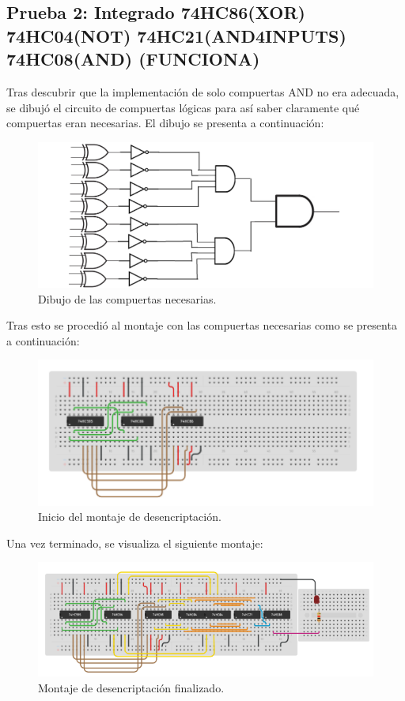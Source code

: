 \documentclass{article}
\begin{document}
\subsection{Prueba 2: Integrado 74HC86(XOR) 74HC04(NOT) 74HC21(AND4INPUTS) 74HC08(AND) (FUNCIONA)}
Tras descubrir que la implementación de solo compuertas AND no era adecuada, se dibujó el circuito de compuertas lógicas para así saber claramente qué compuertas eran necesarias. El dibujo se presenta a continuación:
\begin{figure}[h]
\includegraphics[scale=0.2]{compuertas.png}
\centering
\caption{Dibujo de las compuertas necesarias.}
\label{fig:compuertas}
\end{figure}

\newpage
Tras esto se procedió al montaje con las compuertas necesarias como se presenta a continuación:
\begin{figure}[h]
\includegraphics[scale=0.7]{desencriptacion1.png}
\centering
\caption{Inicio del montaje de desencriptación.}
\label{fig:desencriptación1}
\end{figure}

\newpage
Una vez terminado, se visualiza el siguiente montaje:
\begin{figure}[h]
\includegraphics[scale=0.7]{desencriptacion2.png}
\centering
\caption{Montaje de desencriptación finalizado.}
\label{fig:desencriptación2}
\end{figure}
\end{document}
